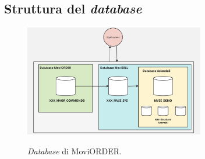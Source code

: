 \subsection{Struttura del \textit{database}}\label{chap:struttura database}

\begin{figure}[H]
    \centering
    \includegraphics[alt={\textit{Database} di MoviORDER}, width=0.7\textwidth]{img/database.png}
    \caption {\textit{Database} di MoviORDER.}
    \label{fig:database}
\end{figure}

